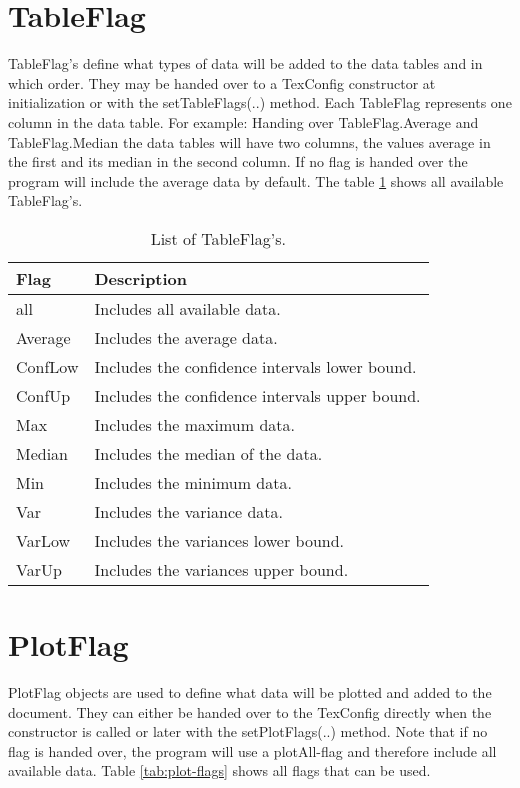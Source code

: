 \section{TableFlag}
TableFlag's define what types of data will be added to the data tables and in which order. They may be handed over to a TexConfig constructor at initialization or with the setTableFlags(..) method. Each TableFlag represents one column in the data table. For example: Handing over TableFlag.Average and TableFlag.Median the data tables will have two columns, the values average in the first and its median in the second column. If no flag is handed over the program will include the average data by default. The table \ref{tab:table-flags} shows all available TableFlag's.

\begin{table}[h]
\centering
\begin{tabular}[h]{|l|l|}\hline
	\textbf{Flag} & \textbf{Description}\\
	\hline
	all & Includes all available data.\\
	\hline
	Average & Includes the average data.\\
	\hline
	ConfLow & Includes the confidence intervals lower bound.\\
	\hline
	ConfUp & Includes the confidence intervals upper bound.\\
	\hline
	Max & Includes the maximum data.\\
	\hline
	Median & Includes the median of the data.\\
	\hline
	Min & Includes the minimum data.\\
	\hline
	Var & Includes the variance data.\\
	\hline
	VarLow & Includes the variances lower bound.\\
	\hline
	VarUp & Includes the variances upper bound.\\
	\hline
\end{tabular}
\caption{List of TableFlag's.}
\label{tab:table-flags}
\end{table}

\section{PlotFlag}
PlotFlag objects are used to define what data will be plotted and added to the document. They can either be handed over to the TexConfig directly when the constructor is called or later with the setPlotFlags(..) method. Note that if no flag is handed over, the program will use a plotAll-flag and therefore include all available data. Table \ref{tab:plot-flags} shows all flags that can be used.

